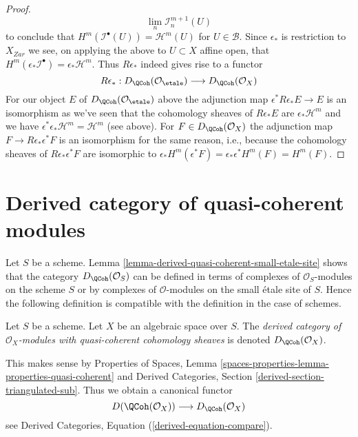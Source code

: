 \begin{proof}
$$\lim_n \mathcal{I}_n^{m + 1}(U)
$$
to conclude that $H^m(\mathcal{I}^\bullet(U)) = \mathcal{H}^m(U)$ for
$U \in \mathcal{B}$. Since $\epsilon_*$ is restriction
to $X_{Zar}$ we see, on applying the above to $U \subset X$
affine open, that
$H^m(\epsilon_*\mathcal{I}^\bullet) = \epsilon_*\mathcal{H}^m$.
Thus $R\epsilon_*$ indeed gives rise to a functor
$$
R\epsilon_* :
D_\QCoh(\mathcal{O}_\etale)
\longrightarrow
D_\QCoh(\mathcal{O}_X)
$$
For our object $E$ of $D_\QCoh(\mathcal{O}_\etale)$ above
the adjunction map $\epsilon^*R\epsilon_*E \to E$
is an isomorphism as we've seen that the cohomology sheaves
of $R\epsilon_*E$ are $\epsilon_*\mathcal{H}^m$ and we have
$\epsilon^*\epsilon_*\mathcal{H}^m = \mathcal{H}^m$ (see above).
For $F \in D_\QCoh(\mathcal{O}_X)$ the
adjunction map $F \to R\epsilon_*\epsilon^*F$
is an isomorphism for the same reason, i.e., because
the cohomology sheaves of $R\epsilon_*\epsilon^*F$
are isomorphic to
$\epsilon_*H^m(\epsilon^*F) = \epsilon_*\epsilon^*H^m(F) = H^m(F)$.
\end{proof}










\section{Derived category of quasi-coherent modules}
\label{section-derived-quasi-coherent}

\noindent
Let $S$ be a scheme. Lemma
\ref{lemma-derived-quasi-coherent-small-etale-site}
shows that the category $D_\QCoh(\mathcal{O}_S)$ can be defined
in terms of complexes of $\mathcal{O}_S$-modules on the scheme $S$
or by complexes of $\mathcal{O}$-modules on the small \'etale site
of $S$. Hence the following definition is compatible with the definition
in the case of schemes.

\begin{definition}
\label{definition-derived-quasi-coherent}
Let $S$ be a scheme. Let $X$ be an algebraic space over $S$.
The {\it derived category of $\mathcal{O}_X$-modules with
quasi-coherent cohomology sheaves} is denoted
$D_\QCoh(\mathcal{O}_X)$.
\end{definition}

\noindent
This makes sense by
Properties of Spaces, Lemma
\ref{spaces-properties-lemma-properties-quasi-coherent}
and
Derived Categories, Section \ref{derived-section-triangulated-sub}.
Thus we obtain a canonical functor
\begin{equation}
\label{equation-compare}
D(\QCoh(\mathcal{O}_X))
\longrightarrow
D_\QCoh(\mathcal{O}_X)
\end{equation}
see Derived Categories, Equation (\ref{derived-equation-compare}).

